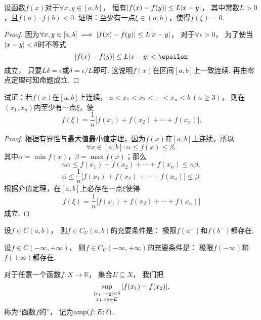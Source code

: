 \begin{example}
设函数\(f(x)\)对于\(\forall x,y \in [a,b]\)，
恒有\(\abs{f(x) - f(y)} \leq L \abs{x - y}\)，
其中常数\(L > 0\)，且\(f(a) \cdot f(b) < 0\).
证明：至少有一点\(\xi \in (a,b)\)，使得\(f(\xi) = 0\).
\begin{proof}
因为\(\forall x,y \in [a,b] \implies \abs{f(x) - f(y)} \leq L \abs{x - y}\)，
对于\(\forall \epsilon > 0\)，
为了使当\(\abs{x - y} < \delta\)时不等式\[
\abs{f(x) - f(y)} \leq L \abs{x - y} < \epsilon
\]成立，
只要\(L \delta = \epsilon\)或\(\delta = \epsilon / L\)即可.
这说明\(f(x)\)在区间\([a,b]\)上一致连续.
再由零点定理可知命题成立.
\end{proof}
\end{example}

\begin{example}
试证：若\(f(x)\)在\([a,b]\)上连续，
\(a < x_1 < x_2 < \dotsb < x_n < b \ (n \geq 3)\)，
则在\((x_1,x_n)\)内至少有一点\(\xi\)，使\[
f(\xi) = \frac{1}{n} \bigl[
	f(x_1) + f(x_2) + \dotsb + f(x_n)
\bigr].
\]
\begin{proof}
根据有界性与最大值最小值定理，因为\(f(x)\)在\([a,b]\)上连续，所以\[
\forall x \in [a,b] :
	\alpha \leq f(x) \leq \beta,
\]其中\(\alpha = \min f(x)\)，\(\beta = \max f(x)\)；那么\[
n \alpha \leq f(x_1) + f(x_2) + \dotsb + f(x_n) \leq n \beta,
\]\[
\alpha \leq \frac{1}{n} \bigl[f(x_1) + f(x_2) + \dotsb + f(x_n)\bigr] \leq \beta.
\]根据介值定理，在\([a,b]\)上必存在一点\(\xi\)使得\[
f(\xi) = \frac{1}{n} \bigl[ f(x_1) + f(x_2) + \dotsb + f(x_n) \bigr]
\]成立.
\end{proof}
\end{example}

\begin{theorem}\label{theorem:极限.闭区间上连续函数的性质.开区间上的连续函数一致连续的充要条件1}
设\(f \in C(a,b)\)，
则\(f \in C_U(a,b)\)的充要条件是：
极限\(f(a^+)\)和\(f(b^-)\)都存在.
\end{theorem}

\begin{theorem}\label{theorem:极限.闭区间上连续函数的性质.开区间上的连续函数一致连续的充要条件2}
设\(f \in C(-\infty,+\infty)\)，
则\(f \in C_U(-\infty,+\infty)\)的充要条件是：
极限\(f(-\infty)\)和\(f(+\infty)\)都存在.
\end{theorem}

\begin{definition}
对于任意一个函数\(f\colon X\to\mathbb{R}\)，
集合\(E \subseteq X\)，
我们把\[
	\sup_{\substack{
		\abs{x_1-x_2}<\delta \\
		x_1,x_2 \in E
	}}\abs{f(x_1)-f(x_2)},
\]
称为“函数\(f\)的”，
记为\(\operatorname{amp}(f;E;\delta)\).
\end{definition}

